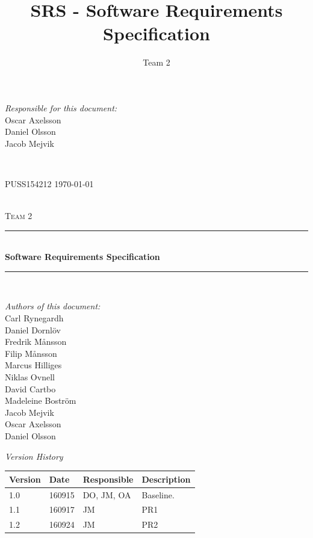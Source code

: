 \documentclass[a4paper]{article}
\title{SRS - Software Requirements Specification}
\author{Team 2}
\begin{document}
\begin{titlepage}
\newcommand{\HRule}{\rule{\linewidth}{0.5mm}}

\begin{minipage}{0.5\textwidth}
\begin{flushleft} %
\textit{Responsible for this document:}\\
Oscar Axelsson \\
Daniel Olsson \\
Jacob Mejvik
\end{flushleft}
\end{minipage}
~
\begin{minipage}{0.4\textwidth}
\begin{flushright}
PUSS154212
\today
\end{flushright}
\end{minipage}\\[3cm]

\centering
\textsc{\LARGE Team 2}\\[0.5cm]

\HRule \\[0.4cm]
{ \huge \bfseries Software Requirements Specification}\\[0.4cm] %
\HRule \\[1.5cm]

\vfill
\begin{flushleft}
\textit{Authors of this document:}\\
Carl Rynegardh \\
Daniel Dornlöv \\
Fredrik Månsson \\
Filip Månsson \\
Marcus Hilliges \\
Niklas Ovnell \\
David Cartbo \\
Madeleine Boström \\
Jacob Mejvik \\
Oscar Axelsson \\
Daniel Olsson
\end{flushleft}



\end{titlepage}
\setcounter{tocdepth}{2}

\begin{center}
\textit{\large Version History}

    \begin{tabular}{ | l | l | l | p{5cm} |}
    \hline
    \textbf{Version} 	& \textbf{Date} 	& \textbf{Responsible} 	& \textbf{Description} 		\\ \hline
    1.0				 	& 160915 			& DO, JM, OA			&  Baseline. 				\\ \hline
    1.1				 	& 160917 			& JM					&  PR1				\\ \hline
    1.2				 	& 160924 			& JM					&  PR2				\\ \hline
    \end{tabular}
\end{center}
\end{document}

